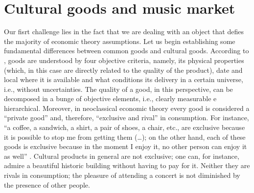 \documentclass[a4paper, 12pt, openright, oneside, german, french, brazil, english]{abntex2}
\begin{document}
	


	\chapter{Cultural goods and music market}
	
	
	Our fisrt challenge lies in the fact that we are dealing with an object that defies the majority of economic theory assumptions. Let us begin establishing some fundamental differences between common goods and cultural goods. According to , goods are understood by four objective criteria, namely, its physical properties (which, in this case are directly related to the quality of the product), date and local where it is available and what conditions its delivery in a certain universe, i.e., without uncertainties. The quality of a good, in this perspective, can be decomposed in a bunge of objective elements, i.e., clearly measurable e hierarchical. Moreover, in neoclassical economic theory every good is considered a ``private good'' and, therefore, ``exclusive and rival'' in consumption. For instance, ``a coffee, a sandwich, a shirt, a pair of shoes, a chair, etc., are exclusive because it is possible to stop me from getting them (\ldots); on the other hand, each of these goods is exclusive because in the moment I enjoy it, no other person can enjoy it as well'' \cite[p. 29]{tolila2007cultura}. Cultural products in general are not exclusive; one can, for instance, admire a beautiful historic building without having to pay for it. Neither they are rivals in consumption; the pleasure of attending a concert is not diminished by the presence of other people. 
\end{document}
